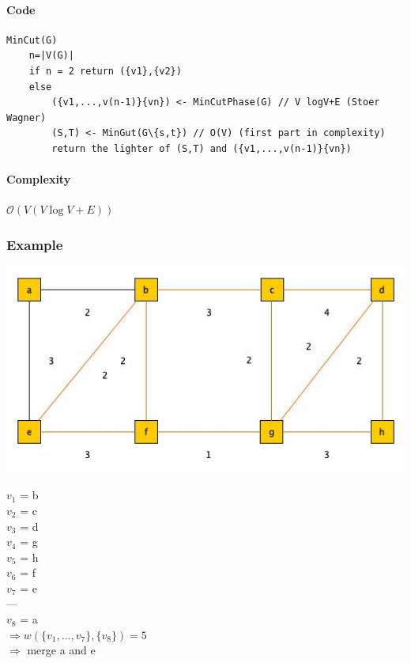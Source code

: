 \paragraph{Code}
\begin{verbatim}
MinCut(G)
    n=|V(G)|
    if n = 2 return ({v1},{v2})
    else
        ({v1,...,v(n-1)}{vn}) <- MinCutPhase(G) // V logV+E (Stoer Wagner)
        (S,T) <- MinGut(G\{s,t}) // O(V) (first part in complexity)
        return the lighter of (S,T) and ({v1,...,v(n-1)}{vn})
\end{verbatim} 

\paragraph{Complexity} $\mathcal{O}(V(V \log V+E))$

\subsubsection{Example}

\begin{center}
	\includegraphics[scale=0.5]{img/graph4}
\end{center}

$v_1$ = b\\
$v_2$ = c\\
$v_3$ = d\\
$v_4$ = g \\
$v_5$ = h \\
$v_6$ = f \\
$v_7$ = e \\
--- \\
$v_8$ = a \\

$\Rightarrow w(\{v_1,...,v_7\},\{v_8\}) = 5$ \\

$\Rightarrow$ merge a and e

